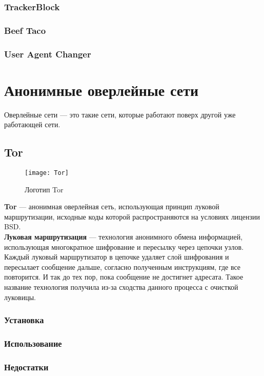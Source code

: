 \subsubsection{TrackerBlock}
\subsubsection{Beef Taco}
\subsubsection{User Agent Changer}

\section{Анонимные оверлейные сети}
Оверлейные сети --- это такие сети, которые работают поверх другой уже работающей сети.
\subsection{Tor}
\begin{wrapfigure}[8]{r}{0.25\linewidth}
\texttt{[image: Tor]}
\caption{Логотип Tor}
\end{wrapfigure}
\textbf{Tor} --- анонимная оверлейная сеть, использующая принцип луковой маршрутизации, исходные коды которой распространяются на условиях лицензии BSD\cite{tor_license}.\\
\textbf{Луковая маршрутизация} --- технология анонимного обмена информацией, использующая многократное шифрование и пересылку через цепочки узлов. Каждый луковый маршрутизатор в цепочке удаляет слой шифрования и пересылает сообщение дальше, согласно полученным инструкциям, где все повторится. И так до тех пор, пока сообщение не достигнет адресата. Такое название технология получила из-за сходства данного процесса с очисткой луковицы.\\
\subsubsection{Установка}
\subsubsection{Использование}
\subsubsection{Недостатки}
